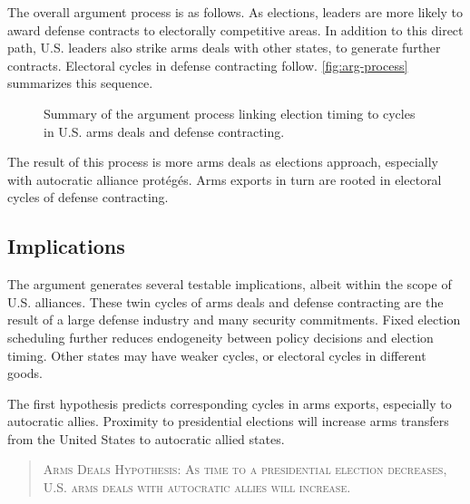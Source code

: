\documentclass[12pt]{article}
\begin{document}
The overall argument process is as follows.
As elections, leaders are more likely to award defense contracts to electorally competitive areas. 
In addition to this direct path, U.S. leaders also strike arms deals with other states, to generate further contracts. 
Electoral cycles in defense contracting follow.  
\autoref{fig:arg-process} summarizes this sequence.



\begin{figure}[htpb]
\centering
{}
\caption{Summary of the argument process linking election timing to cycles in U.S. arms deals and defense contracting.}
\label{fig:arg-process}
\end{figure}


The result of this process is more arms deals as elections approach, especially with autocratic alliance prot{\'e}g{\'e}s.
Arms exports in turn are rooted in electoral cycles of defense contracting.



\subsection{Implications}



The argument generates several testable implications, albeit within the scope of U.S. alliances. 
These twin cycles of arms deals and defense contracting are the result of a large defense industry and many security commitments.
Fixed election scheduling further reduces endogeneity between policy decisions and election timing. 
Other states may have weaker cycles, or electoral cycles in different goods.


The first hypothesis predicts corresponding cycles in arms exports, especially to autocratic allies.
Proximity to presidential elections will increase arms transfers from the United States to autocratic allied states. 


\begin{quote}
\textsc{Arms Deals Hypothesis: As time to a presidential election decreases, U.S. arms deals with autocratic allies will increase.}
\end{quote}
\end{document}
